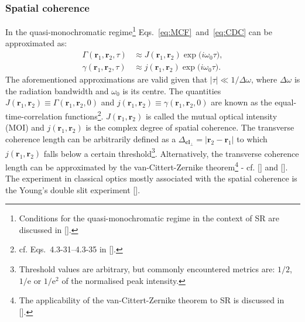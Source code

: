\begin{refsection}
\subsubsection*{Spatial coherence}

In the quasi-monochromatic regime\footnote{Conditions for the quasi-monochromatic regime in the context of SR are discussed in [\cite[\textit{§2.3}]{Geloni2008}].} Eqs.~\ref{eq:MCF}~and~\ref{eq:CDC} can be approximated as:
\begin{align}
    \Gamma(\textbf{r}_1,\textbf{r}_2,\tau) &\approx J(\textbf{r}_1,\textbf{r}_2)\exp{\big(i\omega_0 \tau\big)},\label{eq:Gamma_approx}\\
    \gamma(\textbf{r}_1,\textbf{r}_2,\tau) &\approx j(\textbf{r}_1,\textbf{r}_2)\exp{\big(i\omega_0 \tau\big)}.\label{eq:gamma_approx}
\end{align}{}
The aforementioned approximations are valid given that $|\tau|\ll 1/\Delta\omega$, where $\Delta \omega$ is the radiation bandwidth and $\omega_0$ is its centre. The quantities $J(\textbf{r}_1,\textbf{r}_2)\equiv\Gamma(\textbf{r}_1,\textbf{r}_2,0)$ and $j(\textbf{r}_1,\textbf{r}_2)\equiv\gamma(\textbf{r}_1,\textbf{r}_2,0)$ are known as the equal-time-correlation functions\footnote{cf. Eqs.~4.3-31--4.3-35 in [\cite{Mandel1995}].}. $J(\textbf{r}_1,\textbf{r}_2)$ is called the mutual optical intensity (MOI) and $j(\textbf{r}_1,\textbf{r}_2)$ is the complex degree of spatial coherence. The transverse coherence length can be arbitrarily defined as a $\Delta_{\textbf{cl}_\perp}=|\textbf{r}_2-\textbf{r}_1|$ to which $j(\textbf{r}_1,\textbf{r}_2)$ falls below a certain threshold\footnote{Threshold values are arbitrary, but commonly encountered metrics are: $1/2$, $1/\text{e}$ or $1/\text{e}^2$ of the normalised peak intensity.}. Alternatively, the transverse coherence length can be approximated by the van-Cittert-Zernike theorem\footnote{The applicability of the van-Cittert-Zernike theorem to SR is discussed in [\cite[\textit{§4}]{Geloni2008}].} - cf. [\cite[\textit{§4.4.4}]{Mandel1995}] and [\cite[\textit{§11.3.C}]{Saleh2019}]. The experiment in classical optics mostly associated with the spatial coherence is the Young's double slit experiment [\cite[\textit{§5.2.1}]{Goodman2015}].


\end{refsection}
